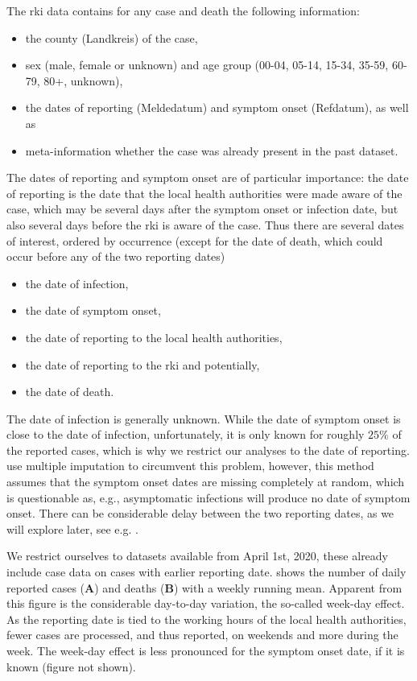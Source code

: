 The \acrshort{rki} data contains for any case and death the following information:
\begin{itemize}
    \item the county (Landkreis) of the case,
    \item sex (male, female or unknown) and age group (00-04, 05-14, 15-34, 35-59, 60-79, 80+, unknown),
    \item the dates of reporting (Meldedatum) and symptom onset (Refdatum), as well as
    \item meta-information whether the case was already present in the past dataset.
\end{itemize}

The dates of reporting and symptom onset are of particular importance: the date of reporting is the date that the local health authorities were made aware of the case, which may be several days after the symptom onset or infection date, but also several days before the \acrshort{rki} is aware of the case. Thus there are several dates of interest, ordered by occurrence (except for the date of death, which could occur before any of the two reporting dates)
\begin{itemize}
    \item the date of infection, 
    \item the date of symptom onset, 
    \item the date of reporting to the local health authorities,
    \item the date of reporting to the \acrshort{rki} and potentially,
    \item the date of death.
\end{itemize}
The date of infection is generally unknown. While the date of symptom onset is close to the date of infection, unfortunately, it is only known for roughly $25\%$ of the reported cases, which is why we restrict our analyses to the date of reporting. \citep{AnDerHeiden2020Schatzung} use multiple imputation to circumvent this problem, however, this method assumes that the symptom onset dates are missing completely at random, which is questionable as, e.g., asymptomatic infections will produce no date of symptom onset. There can be considerable delay between the two reporting dates, as we will explore later, see e.g. .

We restrict ourselves to datasets available from April 1st, 2020, these already include case data on cases with earlier reporting date.  shows the number of daily reported cases (\textbf{A}) and deaths (\textbf{B}) with a weekly running mean. Apparent from this figure is the considerable day-to-day variation, the so-called week-day effect. As the reporting date is tied to the working hours of the local health authorities, fewer cases are processed, and thus reported, on weekends and more during the week. The week-day effect is less pronounced for the symptom onset date, if it is known (figure not shown). 

